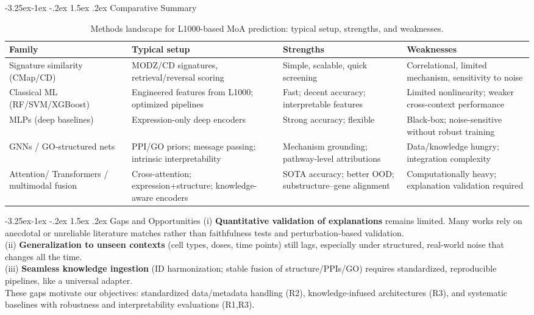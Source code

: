 \documentclass[12pt,a4paper]{article}
\makeatletter
\renewcommand\subsection{\@startsection{subsection}{2}{\z@}%
  {-3.25ex\@plus-1ex \@minus-.2ex}%
  {1.5ex \@plus.2ex}%
  {\normalfont\normalsize\bfseries}}
\makeatother
\begin{document}
\subsection{Comparative Summary}
\begin{table}[h]
  \centering
  \caption{Methods landscape for L1000-based MoA prediction: typical setup, strengths, and weaknesses.}
  \begin{tabular}{p{3.4cm} p{4.6cm} p{3.4cm} p{3.4cm}}
    \toprule
    \textbf{Family} & \textbf{Typical setup} & \textbf{Strengths} & \textbf{Weaknesses} \\
    \midrule
    Signature similarity (CMap/CD) &
    MODZ/CD signatures, retrieval/reversal scoring\cite{subramanian2017next,duan2016l1000cds2} &
    Simple, scalable, quick screening &
    Correlational, limited mechanism, sensitivity to noise \\
    \addlinespace
    Classical ML (RF/SVM/XGBoost) &
    Engineered features from L1000; optimized pipelines\cite{lu2021drug} &
    Fast; decent accuracy; interpretable features &
    Limited nonlinearity; weaker cross-context performance \\
    \addlinespace
    MLPs (deep baselines) &
    Expression-only deep encoders\cite{mcdermott2019deep} &
    Strong accuracy; flexible &
    Black-box; noise-sensitive without robust training \\
    \addlinespace
    GNNs / GO-structured nets &
    PPI/GO priors; message passing; intrinsic interpretability \cite{mcdermott2019deep,samal2022opportunities} &
    Mechanism grounding; pathway-level attributions &
    Data/knowledge hungry; integration complexity \\
    \addlinespace
    Attention/ Transformers / multimodal fusion &
    Cross-attention; expression+structure; knowledge-aware encoders \cite{pham2021deep,wu2022deep,stahlschmidt2022multimodal,elabd2024simple} &
    SOTA accuracy; better OOD; substructure–gene alignment &
    Computationally heavy; explanation validation required \\
    \bottomrule
  \end{tabular}
\end{table}

\subsection{Gaps and Opportunities}
(i) \textbf{Quantitative validation of explanations} remains limited. Many works rely on anecdotal or unreliable literature matches rather than faithfulness tests and perturbation-based validation.\\(ii) \textbf{Generalization to unseen contexts} (cell types, doses, time points) still lags, especially under structured, real-world noise that changes all the time.\\(iii) \textbf{Seamless knowledge ingestion} (ID harmonization; stable fusion of structure/PPIs/GO) requires standardized, reproducible pipelines, like a universal adapter.\\ These gaps motivate our objectives: standardized data/metadata handling (R2), knowledge-infused architectures (R3), and systematic baselines with robustness and interpretability evaluations (R1,R3).
\end{document}
